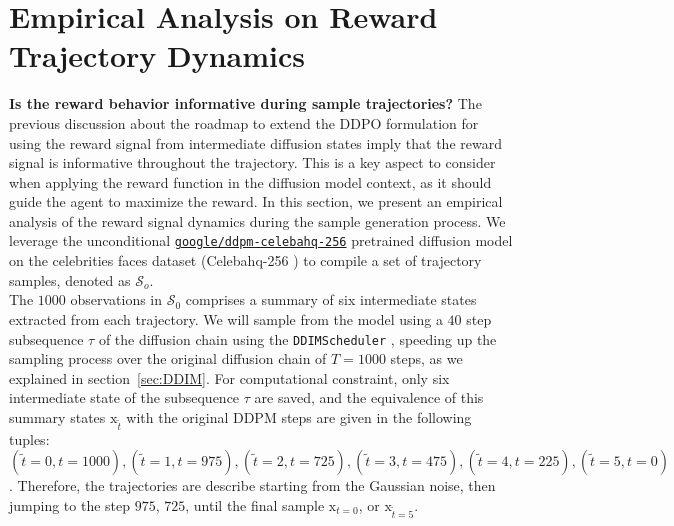 
\section{Empirical Analysis on Reward Trajectory Dynamics}\label{sec:empirical-analysis}

\textbf{Is the reward behavior informative during sample trajectories?} The previous discussion about the roadmap to extend the DDPO formulation for using the reward signal from intermediate diffusion states imply that the reward signal is informative throughout the trajectory. This is a key aspect to consider when applying the reward function in the diffusion model context, as it should guide the agent to maximize the reward. In this section, we present an empirical analysis of the reward signal dynamics during the sample generation process. We leverage the unconditional \href{https://huggingface.co/google/ddpm-celebahq-256}{\texttt{google/ddpm-celebahq-256}} \cite{ho2020denoising} pretrained diffusion model on the celebrities faces dataset (Celebahq-256 \citep{karras2017progressive}) to compile a set of trajectory samples, denoted as $\mathcal{S}_o$. \\

\noindent The $1000$ observations in $\mathcal{S}_{0}$ comprises a summary of six intermediate states extracted from each trajectory. We will sample from the model using a $40$ step subsequence $\tau$ of the diffusion chain using the \texttt{DDIMScheduler} \cite{song2020denoising}, speeding up the sampling process over the original diffusion chain of $T=1000$ steps, as we explained in section~\ref{sec:DDIM}. For computational constraint, only six intermediate state of the subsequence $\tau$ are saved, and the equivalence of this summary states $\mathrm{x}_{\tilde{t}}$ with the original DDPM steps are given in the following tuples: $(\tilde{t}=0, t=1000), (\tilde{t}=1, t=975), (\tilde{t}=2, t=725), (\tilde{t}=3, t=475), (\tilde{t}=4, t=225), (\tilde{t}=5, t=0)$. Therefore,
the trajectories are describe starting from the Gaussian noise, then jumping to the step $975$, $725$, until the final sample $\mathrm{x}_{t=0}$, or $\mathrm{x}_{\tilde{t}=5}$. \\

